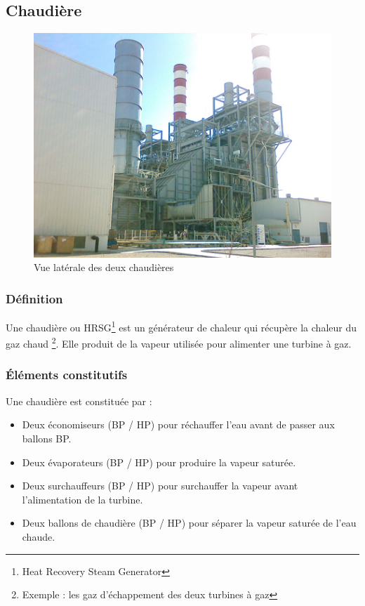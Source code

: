 \subsection{Chaudière}
\begin{figure}[hbtp]
\centering
\includegraphics[scale=1]{./Figures/chaudiere.png}
\caption{Vue latérale des deux chaudières}
\end{figure}

\subsubsection{Définition}
Une chaudière ou HRSG\footnote{Heat Recovery Steam Generator} est un générateur de chaleur qui récupère la chaleur du gaz chaud \footnote{Exemple : les gaz d'échappement des deux turbines à gaz}. Elle produit de la vapeur utilisée pour alimenter une turbine à gaz.
\subsubsection{Éléments constitutifs}
Une chaudière est constituée par :

\begin{itemize}
\item Deux économiseurs (BP / HP) pour réchauffer l'eau avant de passer aux ballons BP.
\item Deux évaporateurs (BP / HP) pour produire la vapeur saturée.
\item Deux surchauffeurs (BP / HP) pour surchauffer la vapeur avant l'alimentation de la turbine.
\item Deux ballons de chaudière (BP / HP) pour séparer la vapeur saturée de l'eau chaude.

\end{itemize} 
